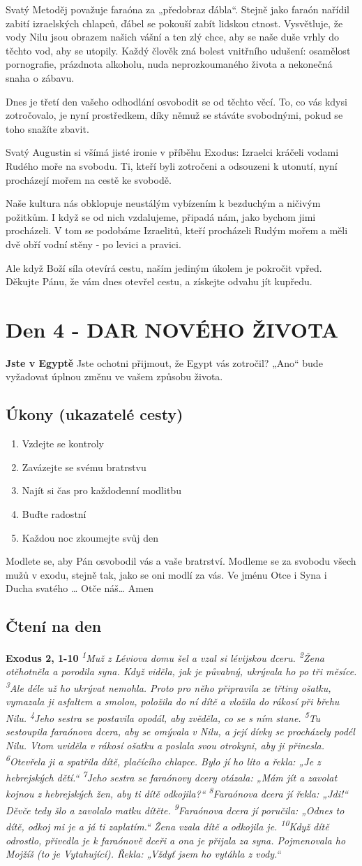 \documentclass[11pt]{article}
\newcommand{\zacatekPrvniTyden}{
  \textbf{Jste v Egyptě} \newline
  Jste ochotni přijmout, že Egypt vás zotročil? „Ano“ bude vyžadovat úplnou změnu ve vašem způsobu života.

\subsection*{Úkony (ukazatelé cesty)}
\begin{enumerate}
  \item Vzdejte se kontroly
  \item Zavázejte se svému bratrstvu
  \item Najít si čas pro každodenní modlitbu
  \item Buďte radostní
  \item Každou noc zkoumejte svůj den
\end{enumerate}
Modlete se, aby Pán osvobodil vás a vaše bratrství. \newline
Modleme se za svobodu všech mužů v exodu, stejně tak, jako se oni modlí za vás.\newline
Ve jménu Otce i Syna i Ducha svatého …  Otče náš… Amen
}
\begin{document}
Svatý Metoděj považuje faraóna za „předobraz ďábla“. Stejně jako faraón nařídil zabití izraelských chlapců, ďábel se pokouší zabít lidskou ctnost. Vysvětluje, že vody Nilu jsou obrazem našich vášní a ten zlý chce, aby se naše duše vrhly do těchto vod, aby se utopily. Každý člověk zná bolest vnitřního udušení: osamělost pornografie, prázdnota alkoholu, nuda neprozkoumaného života a nekonečná snaha o zábavu.

Dnes je třetí den vašeho odhodlání osvobodit se od těchto věcí. To, co vás kdysi zotročovalo, je nyní prostředkem, díky němuž se stáváte svobodnými, pokud se toho snažíte zbavit.

Svatý Augustin si všímá jisté ironie v příběhu Exodus: Izraelci kráčeli vodami Rudého moře na svobodu. Ti, kteří byli zotročeni a odsouzeni k utonutí, nyní procházejí mořem na cestě ke svobodě.

Naše kultura nás obklopuje neustálým vybízením k bezduchým a ničivým požitkům. I když se od nich vzdalujeme, připadá nám, jako bychom jimi procházeli. V tom se podobáme Izraelitů, kteří procházeli Rudým mořem a měli dvě obří vodní stěny - po levici a pravici.

Ale když Boží síla otevírá cestu, naším jediným úkolem je pokročit vpřed.
Děkujte Pánu, že vám dnes otevřel cestu, a získejte odvahu jít kupředu.


\newpage
\section{Den 4 - DAR NOVÉHO ŽIVOTA}
\zacatekPrvniTyden
\subsection*{Čtení na den}
\textbf{Exodus 2, 1-10}
\newline
\textit{
\textsuperscript{1}Muž z Léviova domu šel a vzal si lévijskou dceru.
\textsuperscript{2}Žena otěhotněla a porodila syna. Když viděla, jak je půvabný, ukrývala ho po tři měsíce.
\textsuperscript{3}Ale déle už ho ukrývat nemohla. Proto pro něho připravila ze třtiny ošatku, vymazala ji asfaltem a smolou, položila do ní dítě a vložila do rákosí při břehu Nilu.
\textsuperscript{4}Jeho sestra se postavila opodál, aby zvěděla, co se s ním stane.
\textsuperscript{5}Tu sestoupila faraónova dcera, aby se omývala v Nilu, a její dívky se procházely podél Nilu. Vtom uviděla v rákosí ošatku a poslala svou otrokyni, aby ji přinesla.
\textsuperscript{6}Otevřela ji a spatřila dítě, plačícího chlapce. Bylo jí ho líto a řekla: „Je z hebrejských dětí.“
\textsuperscript{7}Jeho sestra se faraónovy dcery otázala: „Mám jít a zavolat kojnou z hebrejských žen, aby ti dítě odkojila?“
\textsuperscript{8}Faraónova dcera jí řekla: „Jdi!“ Děvče tedy šlo a zavolalo matku dítěte.
\textsuperscript{9}Faraónova dcera jí poručila: „Odnes to dítě, odkoj mi je a já ti zaplatím.“ Žena vzala dítě a odkojila je.
\textsuperscript{10}Když dítě odrostlo, přivedla je k faraónově dceři a ona je přijala za syna. Pojmenovala ho Mojžíš (to je Vytahující). Řekla: „Vždyť jsem ho vytáhla z vody.“}
\end{document}
